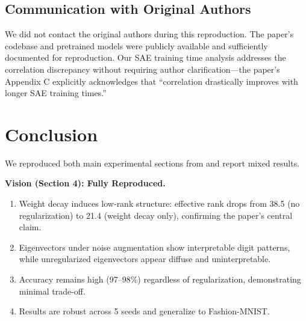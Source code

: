 \subsection{Communication with Original Authors}
\label{sec:authors}

We did not contact the original authors during this reproduction.
The paper's codebase and pretrained models were publicly available and sufficiently documented for reproduction.
Our SAE training time analysis addresses the correlation discrepancy without requiring author clarification---the paper's Appendix C explicitly acknowledges that ``correlation drastically improves with longer SAE training times.''

\section{Conclusion}
\label{sec:conclusion}

We reproduced both main experimental sections from \citet{pearce2024bilinear} and report mixed results.

\textbf{Vision (Section 4): Fully Reproduced.}
\begin{enumerate}
    \item Weight decay induces low-rank structure: effective rank drops from 38.5 (no regularization) to 21.4 (weight decay only), confirming the paper's central claim.
    \item Eigenvectors under noise augmentation show interpretable digit patterns, while unregularized eigenvectors appear diffuse and uninterpretable.
    \item Accuracy remains high (97--98\%) regardless of regularization, demonstrating minimal trade-off.
    \item Results are robust across 5 seeds and generalize to Fashion-MNIST.
\end{enumerate}

